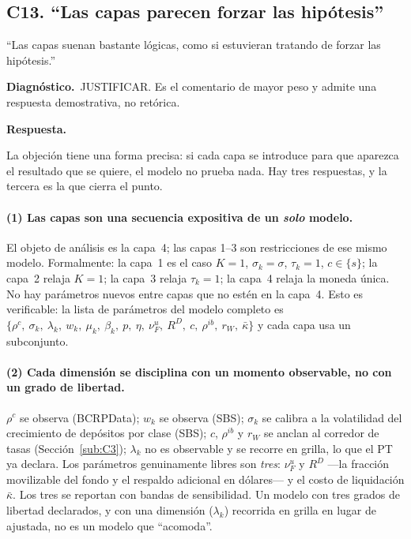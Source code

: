 \documentclass[11pt]{article}
\newcommand{\diag}[1]{\par\noindent\textbf{Diagn\'ostico.}\ #1\par}
\newcommand{\resp}{\par\noindent\textbf{Respuesta.}\par}
\theoremstyle{definition}
\begin{document}
\subsection{C13. ``Las capas parecen forzar las hip\'otesis''}\label{sub:C13}

\begin{jurado}
``Las capas suenan bastante l\'ogicas, como si estuvieran tratando de forzar las
hip\'otesis.''
\end{jurado}

\diag{JUSTIFICAR. Es el comentario de mayor peso y admite una respuesta
demostrativa, no ret\'orica.}

\resp
La objeci\'on tiene una forma precisa: si cada capa se introduce para que
aparezca el resultado que se quiere, el modelo no prueba nada. Hay tres
respuestas, y la tercera es la que cierra el punto.

\paragraph{(1) Las capas son una secuencia expositiva de un \emph{solo} modelo.}
El objeto de an\'alisis es la capa~4; las capas 1--3 son restricciones de ese
mismo modelo. Formalmente: la capa~1 es el caso $K=1$, $\sigma_k=\sigma$,
$\tau_k=1$, $c\in\{s\}$; la capa~2 relaja $K=1$; la capa~3 relaja $\tau_k=1$;
la capa~4 relaja la moneda \'unica. No hay par\'ametros nuevos entre capas que no
est\'en en la capa~4. Esto es verificable: la lista de par\'ametros del modelo
completo es $\{\rho^c,\ \sigma_k,\ \lambda_k,\ w_k,\ \mu_k,\ \beta_k,\ p,\ \eta,\
\nu^u_F,\ R^D,\ c,\ \rho^{ib},\ r_W,\ \bar\kappa\}$ y cada capa usa un
subconjunto.

\paragraph{(2) Cada dimensi\'on se disciplina con un momento observable, no con
un grado de libertad.} $\rho^c$ se observa (BCRPData); $w_k$ se observa (SBS);
$\sigma_k$ se calibra a la volatilidad del crecimiento de dep\'ositos por clase
(SBS); $c$, $\rho^{ib}$ y $r_W$ se anclan al corredor de tasas
(Secci\'on~\ref{sub:C3}); $\lambda_k$ no es observable y se recorre en grilla, lo
que el PT ya declara. Los par\'ametros genuinamente libres son \emph{tres}:
$\nu^u_F$ y $R^D$ ---la fracci\'on movilizable del fondo y el respaldo adicional en
d\'olares--- y el costo de liquidaci\'on $\bar\kappa$. Los tres se reportan con
bandas de sensibilidad. Un modelo con tres grados de libertad declarados, y con
una dimensi\'on ($\lambda_k$) recorrida en grilla en lugar de ajustada, no es un
modelo que ``acomoda''.
\end{document}
